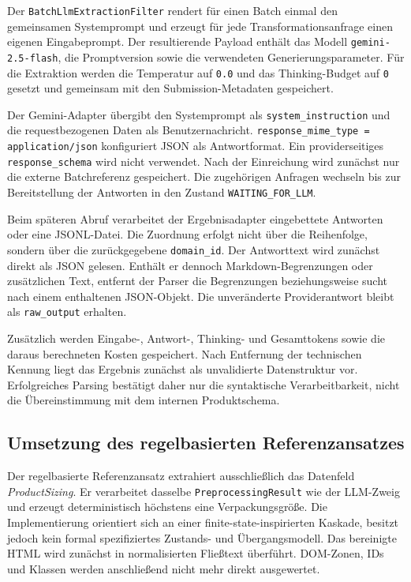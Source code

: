 Der \texttt{BatchLlmExtractionFilter} rendert für einen Batch einmal den gemeinsamen Systemprompt und erzeugt für jede Transformationsanfrage einen eigenen Eingabeprompt. 
Der resultierende Payload enthält das Modell \texttt{gemini-2.5-flash}, die Promptversion sowie die verwendeten Generierungsparameter. Für die Extraktion werden die 
Temperatur auf \texttt{0.0} und das Thinking-Budget auf \texttt{0} gesetzt und gemeinsam mit den Submission-Metadaten gespeichert.

Der Gemini-Adapter übergibt den Systemprompt als \texttt{system\_instruction} und die requestbezogenen Daten als Benutzernachricht. 
\texttt{response\_mime\_type = application/json} konfiguriert JSON als Antwortformat. Ein providerseitiges \texttt{response\_schema} wird nicht verwendet. Nach der Einreichung wird 
zunächst nur die externe Batchreferenz gespeichert. Die zugehörigen Anfragen wechseln bis zur Bereitstellung der Antworten in den Zustand \texttt{WAITING\_FOR\_LLM}.

Beim späteren Abruf verarbeitet der Ergebnisadapter eingebettete Antworten oder eine JSONL-Datei. Die Zuordnung erfolgt nicht über die Reihenfolge, sondern über die zurückgegebene 
\texttt{domain\_id}. Der Antworttext wird zunächst direkt als JSON gelesen. Enthält er dennoch Markdown-Begrenzungen oder zusätzlichen Text, entfernt der Parser die Begrenzungen 
beziehungsweise sucht nach einem enthaltenen JSON-Objekt. Die unveränderte Providerantwort bleibt als \texttt{raw\_output} erhalten.

Zusätzlich werden Eingabe-, Antwort-, Thinking- und Gesamttokens sowie die daraus berechneten Kosten gespeichert. Nach Entfernung der technischen Kennung liegt das Ergebnis zunächst 
als unvalidierte Datenstruktur vor. Erfolgreiches Parsing bestätigt daher nur die syntaktische Verarbeitbarkeit, nicht die Übereinstimmung mit dem internen Produktschema.

\subsection{Umsetzung des regelbasierten Referenzansatzes}

Der regelbasierte Referenzansatz extrahiert ausschließlich das Datenfeld \textit{ProductSizing}. Er verarbeitet dasselbe \texttt{PreprocessingResult} wie der LLM-Zweig und erzeugt 
deterministisch höchstens eine Verpackungsgröße. Die Implementierung orientiert sich an einer finite-state-inspirierten Kaskade, besitzt jedoch kein formal spezifiziertes Zustands- 
und Übergangsmodell. Das bereinigte HTML wird zunächst in normalisierten Fließtext überführt. DOM-Zonen, IDs und Klassen werden anschließend nicht mehr direkt ausgewertet.

